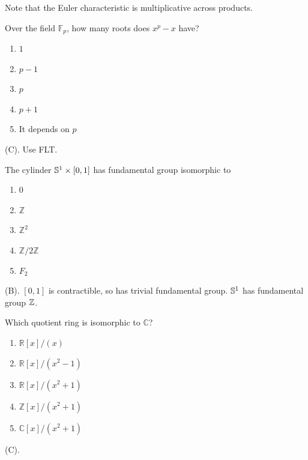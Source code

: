 \begin{remark}
Note that the Euler characteristic is multiplicative across products.
\end{remark}

\begin{exercise}
Over the field $\mathbb{F}_p$, how many roots does $x^p-x$ have?

\begin{enumerate}[label=(\Alph*)]
    \item $1$
    \item $p-1$
    \item $p$
    \item $p+1$
    \item It depends on $p$
\end{enumerate}
\end{exercise}
\begin{solution}
(C). Use FLT.
\end{solution}

\begin{exercise}
The cylinder $\S^1\times[0,1]$ has fundamental group isomorphic to

\begin{enumerate}[label=(\Alph*)]
    \item $0$
    \item $\mathbb{Z}$
    \item $\mathbb{Z}^2$
    \item $\mathbb{Z}/2\mathbb{Z}$
    \item $F_2$
\end{enumerate}
\end{exercise}
\begin{solution}
(B). $[0,1]$ is contractible, so has trivial fundamental group.
$\S^1$ has fundamental group $\Z$.
\end{solution}

\begin{exercise}
Which quotient ring is isomorphic to $\mathbb{C}$?

\begin{enumerate}[label=(\Alph*)]
    \item $\mathbb{R}[x]/(x)$
    \item $\mathbb{R}[x]/(x^2-1)$
    \item $\mathbb{R}[x]/(x^2+1)$
    \item $\mathbb{Z}[x]/(x^2+1)$
    \item $\mathbb{C}[x]/(x^2+1)$
\end{enumerate}
\end{exercise}
\begin{solution}
(C).
\end{solution}

